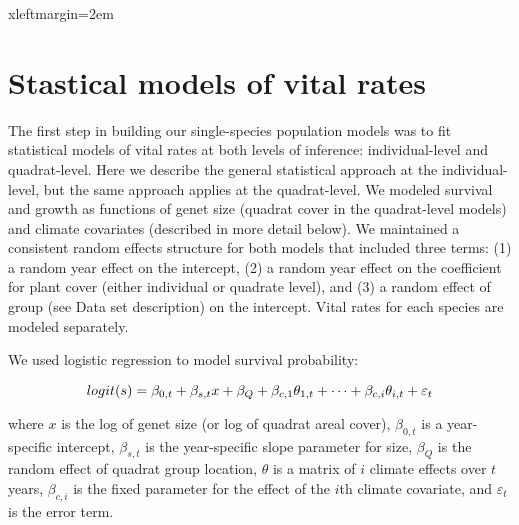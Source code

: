 \documentclass[12pt]{article}
\begin{document}



 {xleftmargin=2em}

\section{Stastical models of vital rates}
The first step in building our single-species population models was to fit statistical models of vital rates at both levels of inference: individual-level and quadrat-level. Here we describe the general statistical approach at the individual-level, but the same approach applies at the quadrat-level. We modeled survival and growth as functions of genet size (quadrat cover in the quadrat-level models) and climate covariates (described in more detail below). We maintained a consistent random effects structure for both models that included three terms: (1) a random year effect on the intercept, (2) a random year effect on the coefficient for plant cover (either individual or quadrate level), and (3) a random effect of group (see Data set description) on the intercept. Vital rates for each species are modeled separately.

We used logistic regression to model survival probability:

\[ 
logit(s) = \beta_{0,t} + \beta_{s,t}x + \beta_{Q} + \beta_{c,1}\theta_{1,t}\\
+ \cdots +  \beta_{c,i}\theta_{i,t} + \varepsilon_{t}
\]

\noindent where $x$ is the log of genet size (or log of quadrat areal cover), $\beta_{0,t}$ is a year-specific intercept, $\beta_{s,t}$ is the year-specific slope parameter for size, $\beta_{Q}$ is the random effect of quadrat group location, $\theta$ is a matrix of $i$ climate effects over $t$ years, $\beta_{c,i}$ is the fixed parameter for the effect of the $i$th climate covariate, and $\varepsilon_{t}$ is the error term. 
\end{document}
